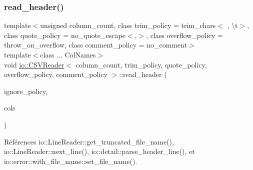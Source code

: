 \mbox{\label{classio_1_1CSVReader_a9fad9ae02aa243dba6bc78156c5ce7e5}} 
\subsubsection{\texorpdfstring{read\+\_\+header()}{read\_header()}}
{\footnotesize\ttfamily template$<$unsigned column\+\_\+count, class trim\+\_\+policy  = trim\+\_\+chars$<$\textquotesingle{} \textquotesingle{}, \textquotesingle{}\textbackslash{}t\textquotesingle{}$>$, class quote\+\_\+policy  = no\+\_\+quote\+\_\+escape$<$\textquotesingle{},\textquotesingle{}$>$, class overflow\+\_\+policy  = throw\+\_\+on\+\_\+overflow, class comment\+\_\+policy  = no\+\_\+comment$>$ \\
template$<$class ... Col\+Names$>$ \\
void \hyperlink{classio_1_1CSVReader}{io\+::\+C\+S\+V\+Reader}$<$ column\+\_\+count, trim\+\_\+policy, quote\+\_\+policy, overflow\+\_\+policy, comment\+\_\+policy $>$\+::read\+\_\+header (\begin{DoxyParamCaption}\item[{\hyperlink{namespaceio_a544bc96f3a6bf086cb82e599be1a8ebc}{ignore\+\_\+column}}]{ignore\+\_\+policy,  }\item[{Col\+Names...}]{cols }\end{DoxyParamCaption})\hspace{0.3cm}{\ttfamily [inline]}}



Références io\+::\+Line\+Reader\+::get\+\_\+truncated\+\_\+file\+\_\+name(), io\+::\+Line\+Reader\+::next\+\_\+line(), io\+::detail\+::parse\+\_\+header\+\_\+line(), et io\+::error\+::with\+\_\+file\+\_\+name\+::set\+\_\+file\+\_\+name().

\mbox{\label{classio_1_1CSVReader_a61ecdcaa62c024bf97c4e5d133478d7e}} 
